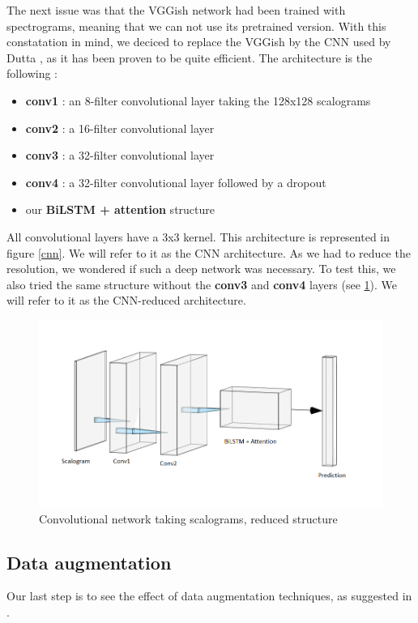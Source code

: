 \documentclass[final]{cvpr}
\begin{document}
The next issue was that the VGGish network had been trained with spectrograms, meaning that we can not use its pretrained version. With this constatation in mind, we deciced to replace the VGGish by the CNN used by Dutta \etal, as it has been proven to be quite efficient. The architecture is the following :
\begin{itemize}
	\item \textbf{conv1} : an 8-filter convolutional layer taking the 128x128 scalograms
	\item \textbf{conv2} : a 16-filter convolutional layer
	\item \textbf{conv3} : a 32-filter convolutional layer
	\item \textbf{conv4} : a 32-filter convolutional layer followed by a dropout
	\item our \textbf{BiLSTM + attention} structure
\end{itemize}
All convolutional layers have a 3x3 kernel. This architecture is represented in figure \ref{cnn}. We will refer to it as the CNN architecture.
As we had to reduce the resolution, we wondered if such a deep network was necessary. To test this, we also tried the same structure without the \textbf{conv3} and \textbf{conv4} layers (see \ref{reduit}). We will refer to it as the CNN-reduced architecture.
\begin{figure}
	\centering
	\includegraphics[scale = 0.45]{cnnreduit.png}
	\caption{Convolutional network taking scalograms, reduced structure}
	\label{reduit}
\end{figure}
\subsection{Data augmentation}
Our last step is to see the effect of data augmentation techniques, as suggested in \cite{squelette_progr}. 
\end{document}
